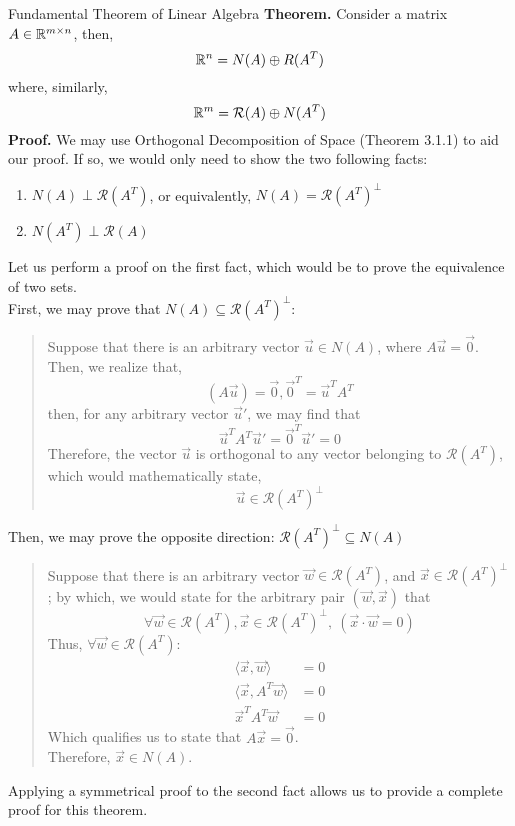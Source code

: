 \begin{ln-theorem}{Fundamental Theorem of Linear Algebra}{}
    \textbf{Theorem.} Consider a matrix $A \in \mathbb{R}^{m \times n}$, then,
    \[\mathbb{R}^n = N(A) \oplus R(A^T)\]
    where, similarly,
    \[\mathbb{R}^m = \mathcal{R}(A) \oplus N(A^T)\]
    \tcblower
    \textbf{Proof.} We may use Orthogonal Decomposition of Space (Theorem 3.1.1) to aid our proof. If so, we would only need to show the two following facts:
    \begin{enumerate}
        \item $N(A) \perp \mathcal{R}(A^T)$, or equivalently, $N(A) = \mathcal{R}(A^T)^\perp$
        \item $N(A^T) \perp \mathcal{R}(A)$
    \end{enumerate}
    Let us perform a proof on the first fact, which would be to prove the equivalence of two sets. \\
    First, we may prove that $N(A) \subseteq \mathcal{R}(A^T)^\perp$:
    \begin{quote}
        Suppose that there is an arbitrary vector $\vec{u} \in N(A)$, where $A \vec{u} = \vec{0}$. \\
        Then, we realize that,
        \[(A \vec{u}) = \vec{0}, \vec{0}^T = \vec{u}^T A^T\]
        then, for any arbitrary vector $\vec{u}'$, we may find that
        \[\vec{u}^T A^T \vec{u}' = \vec{0}^T \vec{u}' = 0\]
        Therefore, the vector $\vec{u}$ is orthogonal to any vector belonging to $\mathcal{R}(A^T)$, which would mathematically state,
        \[\vec{u} \in \mathcal{R}(A^T)^\perp\]
    \end{quote}
    Then, we may prove the opposite direction: $\mathcal{R}(A^T)^\perp \subseteq N(A)$
    \begin{quote}
        Suppose that there is an arbitrary vector $\vec{w} \in \mathcal{R}(A^T)$, and $\vec{x} \in \mathcal{R}(A^T)^\perp$; by which, we would state for the arbitrary pair $(\vec{w}, \vec{x})$ that
        \[
            \forall \vec{w} \in \mathcal{R}(A^T), \vec{x} \in \mathcal{R}(A^T)^\perp ,\ (\vec{x} \cdot \vec{w} = 0)
        \]
        Thus, $\forall \vec{w} \in \mathcal{R}(A^T)$:
        \begin{align*}
            \langle \vec{x}, \vec{w} \rangle &= 0 \\
            \langle \vec{x}, A^T \vec{w} \rangle &= 0 \\
            \vec{x}^T A^T \vec{w} &= 0
        \end{align*}
        Which qualifies us to state that $A \vec{x} = \vec{0}$. \\
        Therefore, $\vec{x} \in N(A)$.
    \end{quote}
    Applying a symmetrical proof to the second fact allows us to provide a complete proof for this theorem.
\end{ln-theorem}

